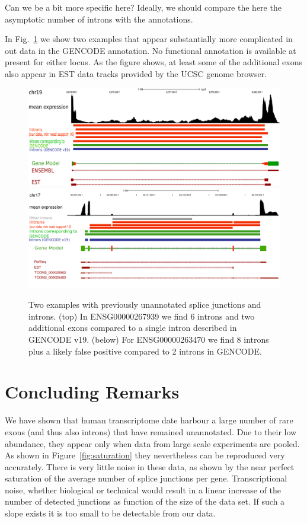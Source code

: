 \documentclass[ncrna,article,submit,moreauthors,pdftex,10pt,a4paper]{mdpi}
\newcommand{\TODO}[1]{\begingroup\color{red}#1\endgroup}
\begin{document}
\TODO{Can we be a bit more specific here? Ideally, we should compare the
  here the asymptotic number of introns with the annotations.}

In Fig.~\ref{fig:examples} we show two examples that appear substantially
more complicated in out data in the GENCODE annotation. No functional
annotation is available at present for either locus. As the figure shows,
at least some of the additional exons also appear in EST data tracks
provided by the UCSC genome browser. 

\begin{figure}[t]
\begin{center}
\includegraphics[width=\textwidth]{267939.pdf}\\[1em]
\includegraphics[width=\textwidth]{example.pdf}
\end{center}
\caption{Two examples with previously unannotated splice junctions and
  introns.  (top) In ENSG00000267939 we find 6 introns and two additional
  exons compared to a single intron described in GENCODE v19.  (below) For
  ENSG00000263470 we find 8 introns plus a likely false positive compared
  to 2 introns in GENCODE.}
\label{fig:examples} 
\end{figure}

\section{Concluding Remarks} 

We have shown that human transcriptome date harbour a large number of rare
exons (and thus also introns) that have remained unannotated. Due to their
low abundance, they appear only when data from large scale experiments are
pooled. As shown in Figure~\ref{fig:saturation} they nevertheless can be
reproduced very accurately. There is very little noise in these data, as
shown by the near perfect saturation of the average number of splice
junctions per gene. Transcriptional noise, whether biological or technical
would result in a linear increase of the number of detected junctions as
function of the size of the data set. If such a slope exists it is too
small to be detectable from our data. 
\end{document}
